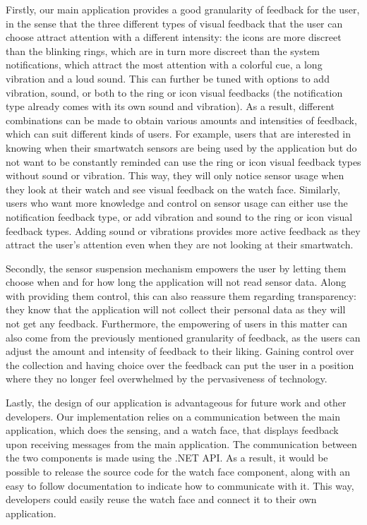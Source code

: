 \documentclass[conference, a4paper, 10pt, twocolumn]{IEEEtran}
\begin{document}
Firstly, our main application provides a good granularity of feedback for the user, in the sense that the three different types of visual feedback that the user can choose attract attention with a different intensity: the icons are more discreet than the blinking rings, which are in turn more discreet than the system notifications, which attract the most attention with a colorful cue, a long vibration and a loud sound. This can further be tuned with options to add vibration, sound, or both to the ring or icon visual feedbacks (the notification type already comes with its own sound and vibration). As a result, different combinations can be made to obtain various amounts and intensities of feedback, which can suit different kinds of users. For example, users that are interested in knowing when their smartwatch sensors are being used by the application but do not want to be constantly reminded can use the ring or icon visual feedback types without sound or vibration. This way, they will only notice sensor usage when they look at their watch and see visual feedback on the watch face. Similarly, users who want more knowledge and control on sensor usage can either use the notification feedback type, or add vibration and sound to the ring or icon visual feedback types. Adding sound or vibrations provides more active feedback as they attract the user's attention even when they are not looking at their smartwatch. 

Secondly, the sensor suspension mechanism empowers the user by letting them choose when and for how long the application will not read sensor data. Along with providing them control, this can also reassure them regarding transparency: they know that the application will not collect their personal data as they will not get any feedback. Furthermore, the empowering of users in this matter can also come from the previously mentioned granularity of feedback, as the users can adjust the amount and intensity of feedback to their liking. Gaining control over the collection and having choice over the feedback can put the user in a position where they no longer feel overwhelmed by the pervasiveness of technology.


Lastly, the design of our application is advantageous for future work and other developers. Our implementation relies on a communication between the main application, which does the sensing, and a watch face, that displays feedback upon receiving messages from the main application. The communication between the two components is made using the .NET \ac{API}. As a result, it would be possible to release the source code for the watch face component, along with an easy to follow documentation to indicate how to communicate with it. This way, developers could easily reuse the watch face and connect it to their own application.
\end{document}
